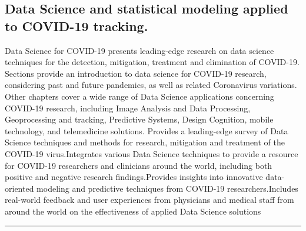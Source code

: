 \documentclass[12pt, letterpaper]{article}
\begin{document}
\begin{center}
\section{Data Science and statistical modeling applied to COVID-19 tracking.}
Data Science for COVID-19 presents leading-edge research on data science techniques for the detection, mitigation, treatment and elimination of COVID-19. Sections provide an introduction to data science for COVID-19 research, considering past and future pandemics, as well as related Coronavirus variations. Other chapters cover a wide range of Data Science applications concerning COVID-19 research, including Image Analysis and Data Processing, Geoprocessing and tracking, Predictive Systems, Design Cognition, mobile technology, and telemedicine solutions.
Provides a leading-edge survey of Data Science techniques and methods for research, mitigation and treatment of the COVID-19 virus.Integrates various Data Science techniques to provide a resource for COVID-19 researchers and clinicians around the world, including both positive and negative research findings.Provides insights into innovative data-oriented modeling and predictive techniques from COVID-19 researchers.Includes real-world feedback and user experiences from physicians and medical staff from around the world on the effectiveness of applied Data Science solutions
\rule{\textwidth}{0.5pt}

\end{center}
\end{document}
